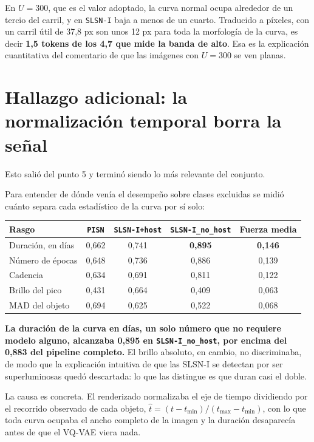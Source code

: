 \documentclass[11pt,a4paper]{article}
\begin{document}
En $U = 300$, que es el valor adoptado, la curva normal ocupa alrededor de un tercio del
carril, y en \texttt{SLSN-I} baja a menos de un cuarto. Traducido a píxeles, con un carril
útil de 37,8 px son unos 12 px para toda la morfología de la curva, es decir
\textbf{1,5 tokens de los 4,7 que mide la banda de alto}. Esa es la explicación cuantitativa
del comentario de que las imágenes con $U = 300$ se ven planas.

\section*{Hallazgo adicional: la normalización temporal borra la señal}

Esto salió del punto 5 y terminó siendo lo más relevante del conjunto.

Para entender de dónde venía el desempeño sobre clases excluidas se midió cuánto separa cada
estadístico de la curva por sí solo:

\begin{table}[H]
\centering
\small
\begin{tabular}{@{}lcccc@{}}
\toprule
\textbf{Rasgo} & \texttt{PISN} & \texttt{SLSN-I+host} & \texttt{SLSN-I\_no\_host} &
\textbf{Fuerza media} \\
\midrule
Duración, en días  & 0,662 & 0,741 & \textbf{0,895} & \textbf{0,146} \\
Número de épocas   & 0,648 & 0,736 & 0,886 & 0,139 \\
Cadencia           & 0,634 & 0,691 & 0,811 & 0,122 \\
Brillo del pico    & 0,431 & 0,664 & 0,409 & 0,063 \\
MAD del objeto     & 0,694 & 0,625 & 0,522 & 0,068 \\
\bottomrule
\end{tabular}
\end{table}

\textbf{La duración de la curva en días, un solo número que no requiere modelo alguno,
alcanzaba 0,895 en \texttt{SLSN-I\_no\_host}, por encima del 0,883 del pipeline completo.} El
brillo absoluto, en cambio, no discriminaba, de modo que la explicación intuitiva de que las
SLSN-I se detectan por ser superluminosas quedó descartada: lo que las distingue es que duran
casi el doble.

La causa es concreta. El renderizado normalizaba el eje de tiempo dividiendo por el recorrido
observado de cada objeto, $\hat{t} = (t - t_{\min})/(t_{\max} - t_{\min})$, con lo que toda
curva ocupaba el ancho completo de la imagen y la duración desaparecía antes de que el VQ-VAE
viera nada.
\end{document}
